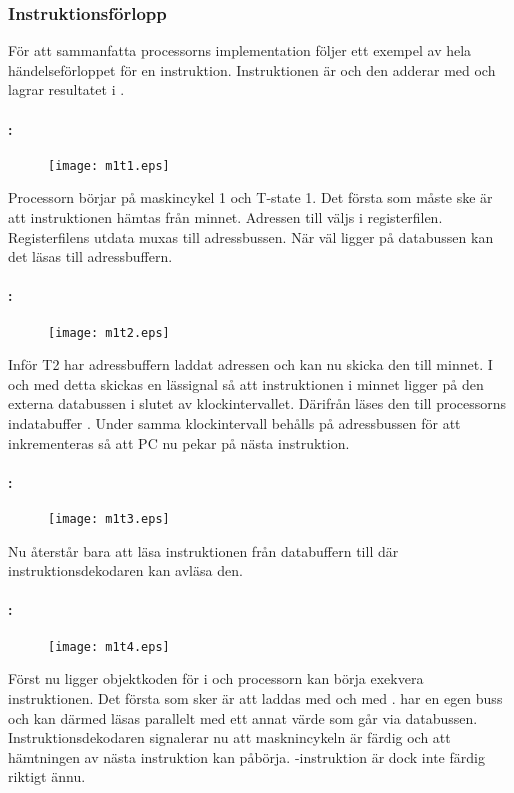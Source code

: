 \documentclass[main.tex]{subfiles}
\newcommand{\diagw}{0.7\textwidth}
\begin{document}
\subsubsection{Instruktionsförlopp}
För att sammanfatta processorns implementation följer ett exempel av hela
händelseförloppet för en instruktion. Instruktionen är  och den adderar
 med  och lagrar resultatet i .

\paragraph{: }
\begin{figure}[H]
    \center
    \texttt{[image: m1t1.eps]}
\end{figure}
Processorn börjar på maskincykel 1 och T-state 1. Det första som måste ske är
att instruktionen hämtas från minnet. Adressen till  väljs i
registerfilen. Registerfilens utdata muxas till adressbussen.  När 
väl ligger på databussen kan det läsas till adressbuffern.

\paragraph{: }
\begin{figure}[H]
    \center
    \texttt{[image: m1t2.eps]}
\end{figure}
Inför T2 har adressbuffern laddat adressen och kan nu skicka den till minnet. I
och med detta skickas en lässignal så att instruktionen i minnet ligger på den
externa databussen i slutet av klockintervallet. Därifrån läses den till
processorns indatabuffer . Under samma klockintervall behålls
 på adressbussen för att inkrementeras så att PC nu pekar på nästa
instruktion.

\paragraph{: }
\begin{figure}[H]
    \center
    \texttt{[image: m1t3.eps]}
\end{figure}
Nu återstår bara att läsa instruktionen från databuffern till  där
instruktionsdekodaren kan avläsa den.

\paragraph{: }
\begin{figure}[H]
    \center
    \texttt{[image: m1t4.eps]}
\end{figure}
Först nu ligger objektkoden för  i  och processorn kan
börja exekvera instruktionen. Det första som sker är att  laddas med
 och  med .  har en egen buss och kan därmed
läsas parallelt med ett annat värde som går via databussen.
Instruktionsdekodaren signalerar nu att masknincykeln är färdig och att
hämtningen av nästa instruktion kan påbörja. -instruktion är dock
inte färdig riktigt ännu.
\end{document}

